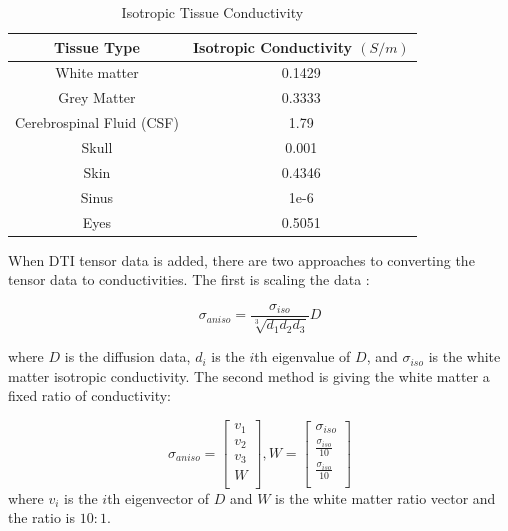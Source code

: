 \begin{table}[H]
\centering
\caption{Isotropic Tissue Conductivity}
\label{tab:cond}
\begin{tabular}{|c|c|}
\hline
Tissue Type               & Isotropic Conductivity $(S/m)$ \\ \hline
White matter              & 0.1429                         \\ \hline
Grey Matter               & 0.3333                         \\ \hline
Cerebrospinal Fluid (CSF) & 1.79                           \\ \hline
Skull                     & 0.001                          \\ \hline
Skin                      & 0.4346                         \\ \hline
Sinus                     & 1e-6                           \\ \hline
Eyes                      & 0.5051                         \\ \hline
\end{tabular}
\end{table}

When DTI tensor data is added, there are two approaches to converting the tensor data to conductivities. The first is scaling the data \cite{ref:scaling}: 

\begin{equation}
\label{eq:scaling}
\sigma_{aniso} = \frac{\sigma_{iso}}{\sqrt[3]{d_1d_2d_3}}D
\end{equation}

where $D$ is the diffusion data, $d_i$ is the $i$th eigenvalue of $D$, and $\sigma_{iso}$ is the white matter isotropic conductivity. The second method is giving the white matter a fixed ratio of conductivity:

\begin{equation}
\label{eq:fixed}
\sigma_{aniso} = \begin{bmatrix}
v_1\\
v_2\\
v_3\\
W\\
\end{bmatrix}, 
W = \begin{bmatrix}
\sigma_{iso}\\
\frac{\sigma_{iso}}{10}\\
\frac{\sigma_{iso}}{10}\\
\end{bmatrix}
\end{equation}
where $v_i$ is the $i$th eigenvector of $D$ and $W$ is the white matter ratio vector and the ratio is $10:1$.

